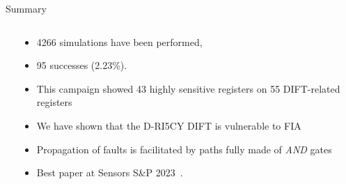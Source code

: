 \begin{frame}{Summary}
    \begin{columns}
        \begin{column}{.15\linewidth}
            \hfill
        \end{column}
        \begin{column}{.7\linewidth}
            \begin{itemize}
                [triangle]
                \item 4266 simulations have been performed,
                \item 95 successes (2.23\%).
                \item This campaign showed 43 highly sensitive registers on 55 DIFT-related registers
                \item We have shown that the D-RI5CY DIFT is vulnerable to FIA
                \item Propagation of faults is facilitated by paths fully made of \textit{AND} gates
            \end{itemize}

                \begin{itemize}
                    [triangle]
                    \item Best paper at Sensors S\&P 2023~\cite{PLG-23-SensorsSP}.
                \end{itemize}
        \end{column}
        \begin{column}{.15\linewidth}
            \hfill
        \end{column}
    \end{columns}
    
\end{frame}
